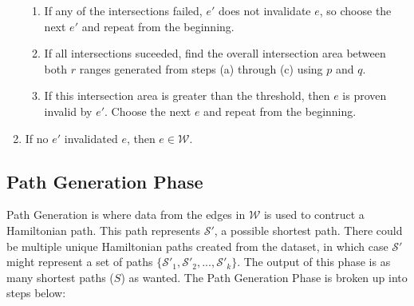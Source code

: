 \documentclass[12pt]{article}
\begin{document}
\begin{enumerate}
\begin{enumerate}
\item If any of the intersections failed, $e'$ does not invalidate $e$,
so choose the next $e'$ and repeat from the beginning.
\item If all intersections suceeded, find the overall intersection area between
both $r$ ranges generated from steps (a) through (c) using $p$ and $q$.
\item If this intersection area is greater than the threshold, then $e$ is proven
invalid by $e'$. Choose the next $e$ and repeat from the beginning.
\end{enumerate}
\item If no $e'$ invalidated $e$, then $e \in \mathcal{W}$.
\end{enumerate}

\subsection{Path Generation Phase}\label{subsec:path-gen}
Path Generation is where data from the edges in $\mathcal{W}$ is used to contruct a
Hamiltonian path. This path represents $\mathcal{S}'$, a possible shortest path.
There could be multiple unique Hamiltonian paths created from the dataset,
in which case $\mathcal{S}'$ might represent a set of paths
$\{\mathcal{S}'_1, \mathcal{S}'_2, ..., \mathcal{S}'_k\}$.
The output of this phase is as many shortest paths
($S$) as wanted.
The Path Generation Phase is broken up into steps below:
\end{document}
